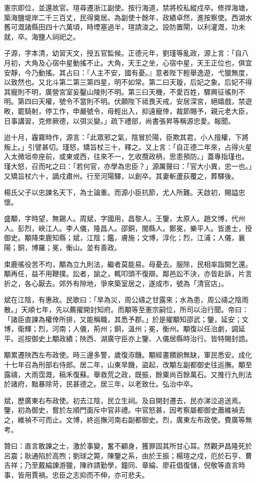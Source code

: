 \begin{pinyinscope}
憲宗即位，並還故官。瑄尋遷浙江副使。按行海道，禁將校私縱戍卒。修捍海塘，築海鹽堤岸二千三百丈，民得奠居。為副使十餘年，政績卓然，進按察使。西湖水舊可溉諸縣田四十六萬頃，時堙塞過半，瑄請浚之。設防置閘，以利灌溉，功未就，卒。海鹽人祠祀之。

子源，字本清，幼習天文，授五官監候。正德元年，劉瑾等亂政，源上言：「自八月初，大角及心宿中星動搖不止。大角，天王之坐，心宿中星，天王正位也，俱宜安靜，今乃動搖。其占曰：『人主不安，國有憂。』意者陛下輕舉逸遊，弋獵無度，以致然也。又北斗第二第三第四星，明不如常。第二曰天璇，后妃之象。后妃不得其寵則不明，廣營宮室妄鑿山陵則不明。第三曰天機，不愛百姓，驟興征徭則不明。第四曰天權，號令不當則不明。伏願陛下祗畏天戒，安居深宮，絕嬉戲，禁遊畋，罷騎射，停工作，申嚴號令，毋輕出入，抑遠寵倖，裁節賜予，親元老大臣，日事講習，克修厥德，以弭災變。」疏下禮部，尚書張昇等稱源忠愛。報聞。

迨十月，霾霧時作，源言：「此眾邪之氣，陰冒於陽，臣欺其君，小人擅權，下將叛上。」引譬甚切。瑾怒，矯旨杖三十，釋之。又上言：「自正德二年來，占得火星入太微垣帝座前，或東或西，往來不一，乞收攬政柄，思患預防。」蓋專指瑾也。瑾大怒，召而叱之曰：「若何官，亦學為忠臣？」源厲聲曰：「官大小異，忠一也。」又矯旨杖六十，謫戍肅州。行至河陽驛，以創卒。其妻斬蘆荻覆之，葬驛後。

楊氏父子以忠諫名天下，為士論重。而源小臣抗節，尤人所難。天啟初，賜謚忠懷。

盛顒，字時望，無錫人。周斌，字國用，昌黎人。王鑒，太原人。趙文博，代州人。彭烈，峽江人。李人儀，隆昌人。邵銅，閩縣人。鄭冕，樂平人。皆進士，授御史。顒降束鹿知縣；斌，江陰；鑑，膚施；文博，淳化；烈，江浦；人儀，襄陽；銅，博羅；冕，衡山。並有善政。

束鹿徭役苦不均，顒為立九則法，繼者莫能易。母憂去。服除，民相率詣闕乞還。顒再任，益不用鞭撲。訟者，諭之，輒叩頭不復辯。鄰邑訟不決，亦皆赴訴，片言折之，各心厭去。郊外有隙地，爭來築室居之，遂成市，號為「清官店」。

斌在江陰，有惠政。民歌曰：「旱為災，周公禱之甘露來；水為患，周公禱之陰雨散。」天順七年，先以薦擢開封知府。而顒等至憲宗嗣位，所司以治行聞。帝曰：「諸臣直諫為權倖所排，又能稱職，其悉予郡。」於是擢顒知邵武；鑒，延安；文博，衛輝；烈，河南；人儀，荊州；銅，溫州；冕，衡州。顒復以任治劇，調延平。巡按御史上顒政績；陜西、湖廣守臣亦上鑒、人儀居縣時治行。皆特賜封誥。

顒累遷陜西左布政使。時三邊多警，歲復洊饑。顒經畫饋餉無缺，軍民悉安。成化十七年召為刑部右侍郎。居二年，山東旱饑，盜起，改顒左副都御史往巡撫。顒至露禱，大雨霑溉，稿禾復蘇。舉救荒之政，既振，餘粟尚百餘萬石。又推行九則法於諸府，黜暴除苛，民甚德之。居三年，以老致仕。弘治中卒。

斌，歷廣東右布政使。初去江陰，民立生祠。及自開封遷去，民亦涕泣追送焉。鑒，初為御史，嘗於左順門面斥中官非禮。中官怒甚，因考察屬都御史蕭維禎去之，維禎不可而止。文博，終巡撫河南右副都御史。烈，廣東左布政使。費廣等無考。

贊曰：直言敢諫之士，激於事變，奮不顧身，獲罪固其所甘心耳。然觀尹昌隆死於呂震；耿通陷於高煦；劉球之斃，陳鑒之系，由於王振；楊瑄之戍，厄於石亨、曹吉祥；乃至戴綸諫游獵，陳祚請勤學，鐘同、章綸、廖莊倡復儲，倪敬等直言時事，皆用賈禍。忠臣之志抑而不伸，亦可悲夫。


\end{pinyinscope}